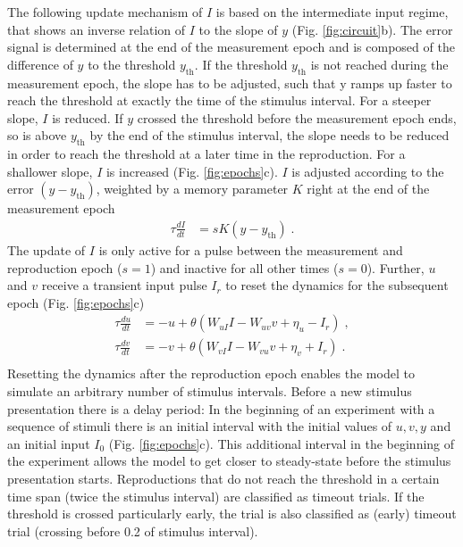 \documentclass[10pt]{article}
\begin{document}
The following update mechanism of $I$ is based on the intermediate input regime, that shows an inverse relation of $I$ to the slope of $y$ (Fig. \ref{fig:circuit}b).
The error signal is determined at the end of the measurement epoch and is composed of the difference of $y$ to the threshold $y_{\text{th}}$.
If the threshold $y_{\text{th}}$ is not reached during the measurement epoch, the slope has to be adjusted, such that y ramps up faster to reach the threshold at exactly the time of the stimulus interval. For a steeper slope, $I$ is reduced.
If $y$ crossed the threshold before the measurement epoch ends, so is above $y_{\text{th}}$ by the end of the stimulus interval, the slope needs to be reduced in order to reach the threshold at a later time in the reproduction. For a shallower slope, $I$ is increased (Fig. \ref{fig:epochs}c).
$I$ is adjusted according to the error $(y-y_{\text{th}})$, weighted by a memory parameter $K$ right at the end of the measurement epoch
\begin{equation} \label{Iupdate}
	\begin{split}
	\tau\frac{dI}{dt} & = sK(y-y_{\text{th}}) \;.
	\end{split}
\end{equation}
The update of $I$ is only active for a pulse between the measurement and reproduction epoch ($s=1$) and inactive for all other times ($s=0$).
Further, $u$ and $v$ receive a transient input pulse $I_r$ to reset the dynamics for the subsequent epoch (Fig. \ref{fig:epochs}c)
\begin{equation} \label{experimentcircuit}
	\begin{split}
	\tau\frac{du}{dt} & = -u + \theta(W_{uI}I - W_{uv}v + \eta_u - I_r) \;,\\
	\tau\frac{dv}{dt} & = -v + \theta(W_{vI}I - W_{vu}v + \eta_v + I_r) \;.\\
	\end{split}
\end{equation}
Resetting the dynamics after the reproduction epoch enables the model to simulate an arbitrary number of stimulus intervals. 
Before a new stimulus presentation there is a delay period: In the beginning of an experiment with a sequence of stimuli there is an initial interval with the initial values of $u, v, y$ and an initial input $I_0$ (Fig. \ref{fig:epochs}c). 
This additional interval in the beginning of the experiment allows the model to get closer to steady-state before the stimulus presentation starts. 
Reproductions that do not reach the threshold in a certain time span (twice the stimulus interval) are classified as timeout trials. 
If the threshold is crossed particularly early, the trial is also classified as (early) timeout trial (crossing before 0.2 of stimulus interval).
\end{document}
